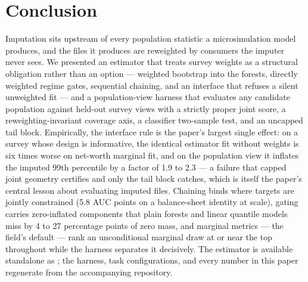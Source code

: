 \section{Conclusion}
\label{imp:sec:conclusion}

Imputation sits upstream of every population statistic a microsimulation
model produces, and the files it produces are reweighted by consumers the
imputer never sees. We presented an estimator that treats survey weights as a
structural obligation rather than an option --- weighted bootstrap into the
forests, directly weighted regime gates, sequential chaining, and an
interface that refuses a silent unweighted fit --- and a population-view
harness that evaluates any candidate population against held-out survey
views with a strictly proper joint score, a reweighting-invariant coverage
axis, a classifier two-sample test, and an uncapped tail block. Empirically,
the interface rule is the paper's largest single effect: on a survey whose
design is informative, the identical estimator fit without weights is six
times worse on net-worth marginal fit, and on the population view it inflates
the imputed 99th percentile by a factor of 1.9 to 2.3 --- a failure that
capped joint geometry certifies and only the tail block catches, which is
itself the paper's central lesson about evaluating imputed files. Chaining
binds where targets are jointly constrained (5.8 AUC points on a
balance-sheet identity at \populace{} scale), gating carries zero-inflated
components that plain forests and linear quantile models miss by 4 to 27
percentage points of zero mass, and marginal metrics --- the field's default
--- rank an unconditional marginal draw at or near the top throughout while
the harness separates it decisively. The estimator is available standalone
as \populacefit{}; the harness, task configurations, and every number in
this paper regenerate from the accompanying repository.
